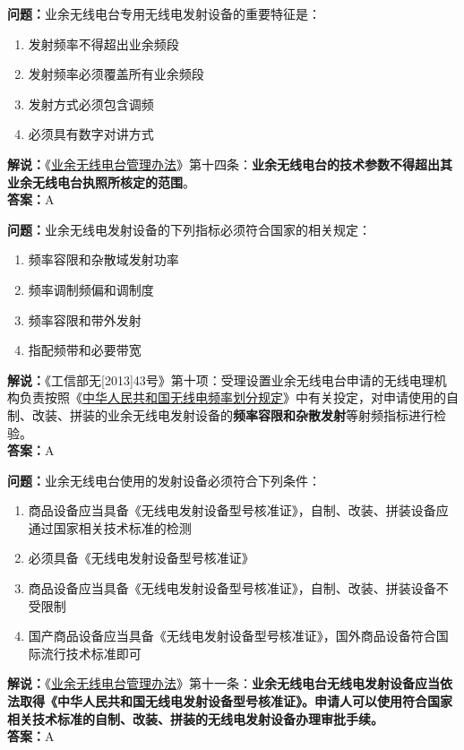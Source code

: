 \textbf{问题：}业余无线电台专用无线电发射设备的重要特征是：
\begin{enumerate}[label=\Alph*), leftmargin=1.5cm]
	\item 发射频率不得超出业余频段
	\item 发射频率必须覆盖所有业余频段
	\item 发射方式必须包含调频
	\item 必须具有数字对讲方式
\end{enumerate}
\textbf{解说：}《\href{https://www.miit.gov.cn/jgsj/zfs/bmgz/art/2020/art_147b69815b3641caad9047735f94c860.html}{业余无线电台管理办法}》第十四条：\textbf{业余无线电台的技术参数不得超出其业余无线电台执照所核定的范围}。\\\textbf{答案：}A%

\textbf{问题：}业余无线电发射设备的下列指标必须符合国家的相关规定：
\begin{enumerate}[label=\Alph*), leftmargin=1.5cm]
	\item 频率容限和杂散域发射功率
	\item 频率调制频偏和调制度
	\item 频率容限和带外发射
	\item 指配频带和必要带宽
\end{enumerate}
\textbf{解说：}《工信部无[2013]43号》第十项：受理设置业余无线电台申请的无线电理机构负责按照《\href{https://www.miit.gov.cn/zwgk/zcwj/wjfb/txy/art/2020/art_066386284cd2449493586c81ccafed11.html}{中华人民共和国无线电频率划分规定}》中有关投定，对申请使用的自制、改装、拼装的业余无线电发射设备的\textbf{频率容限和杂散发射}等射频指标进行检验。\\\textbf{答案：}A


\textbf{问题：}业余无线电台使用的发射设备必须符合下列条件：
\begin{enumerate}[label=\Alph*), leftmargin=1.5cm]
	\item 商品设备应当具备《无线电发射设备型号核准证》，自制、改装、拼装设备应通过国家相关技术标准的检测
	\item 必须具备《无线电发射设备型号核准证》
	\item 商品设备应当具备《无线电发射设备型号核准证》，自制、改装、拼装设备不受限制
	\item 国产商品设备应当具备《无线电发射设备型号核准证》，国外商品设备符合国际流行技术标准即可
\end{enumerate}
\textbf{解说：}《\href{https://www.miit.gov.cn/jgsj/zfs/bmgz/art/2020/art_147b69815b3641caad9047735f94c860.html}{业余无线电台管理办法}》第十一条：\textbf{业余无线电台无线电发射设备应当依法取得《中华人民共和国无线电发射设备型号核准证》。申请人可以使用符合国家相关技术标准的自制、改装、拼装的无线电发射设备办理审批手续。}\\\textbf{答案：}A


